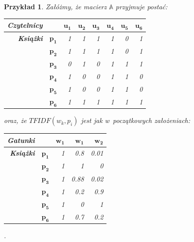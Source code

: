 \documentclass[12pt,a4paper]{report}
\newtheorem{przyklad}{Przykład}[chapter]{\normalfont}
\begin{document}
\begin{przyklad}
Załóżmy, że macierz $\mathbb{A}$ przyjmuje postać:
\begin{center}
\begin{tabular}{|r|r|r|r|r|r|r|r|} \hline
\textbf{Czytelnicy} & & $\mathbf{u_1}$ & $\mathbf{u_2}$ & $\mathbf{u_3}$ & $\mathbf{u_4}$ & $\mathbf{u_5}$ & $\mathbf{u_6}$ \\
\hline
\hline
\textbf{Książki} &$\mathbf{p_1}$ & 1 & 1 & 1 & 1 & 0 & 1 \\
\hline
&$\mathbf{p_2}$ & 1 & 1 & 1 & 1 & 0 & 1 \\
\hline
&$\mathbf{p_3}$ & 0 & 1 & 0 & 1 & 1 & 1 \\
\hline
&$\mathbf{p_4}$ & 1 & 0 & 0 & 1 & 1 & 0 \\
\hline
&$\mathbf{p_5}$ & 1 & 0 & 0 & 1 & 1 & 0 \\
\hline
&$\mathbf{p_6}$ & 1 & 1 & 1 & 1 & 1 & 1 \\
\hline
\end{tabular}
\end{center}

oraz, że $TFIDF(w_k, p_i)$ jest jak w~początkowych założeniach:
\begin{center}
\begin{tabular}{|r|r|r|r|r|} \hline
\textbf{Gatunki} & & $\mathbf{w_1}$ &  $\mathbf{w_1}$ & $\mathbf{w_2}$  \\
\hline
\hline
\textbf{Książki} &$\mathbf{p_1}$ & 1 & 0.8 & 0.01 \\
\hline
&$\mathbf{p_2}$ & 1 & 1 & 0  \\
\hline
&$\mathbf{p_3}$ & 1 & 0.88 & 0.02 \\
\hline
&$\mathbf{p_4}$ & 1 & 0.2 & 0.9 \\
\hline
&$\mathbf{p_5}$ & 1 & 0 & 1 \\
\hline
&$\mathbf{p_6}$ & 1 & 0.7 & 0.2 \\
\hline
\end{tabular}.
\end{center}


\end{przyklad}
\end{document}
